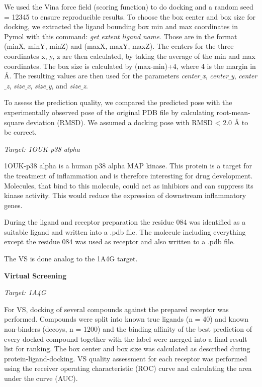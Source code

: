 \documentclass[a4paper,10pt]{article}
\begin{document}
We used the Vina force field (scoring function) to do docking and a random seed = 12345 to ensure reproducible results. To choose the box center and box size for docking, we extracted the ligand bounding box min and max coordinates in Pymol with this command: \textit{get$\_$extent ligand$\_$name}. Those are in the format (minX, minY, minZ) and (maxX, maxY, maxZ). The centers for the three coordinates x, y, z are then calculated, by taking the average of the min and max coordinates. The box size is calculated by (max-min)+4, where 4 is the margin in Å. The resulting values are then used for the parameters \textit{center$\_$x}, \textit{center$\_$y}, \textit{center$\_$z}, \textit{size$\_$x}, \textit{size$\_$y}, and \textit{size$\_$z}.

To assess the prediction quality, we compared the predicted pose with the experimentally observed pose of the original PDB file by calculating root-mean-square deviation (RMSD). We assumed a docking pose with RMSD < 2.0 Å to be correct.

\textit{Target: 1OUK-p38 alpha}

1OUK-p38 alpha is  a human p38 alpha MAP kinase. This protein is a target for the treatment of inflammation and is therefore interesting for drug development. Molecules, that bind to this molecule, could act as inhibiors and can suppress its kinase activity. This would reduce the expression of downstream inflammatory genes. \cite{1OUK}

During the ligand and receptor preparation the residue 084 was identified as a suitable ligand and written into a .pdb file. The molecule including everything except the residue 084 was used as receptor and also written to a .pdb file. 

The VS is done analog to the 1A4G target.

\textbf{Virtual Screening}

\textit{Target: 1A4G}

For VS, docking of several compounds against the prepared receptor was performed. Compounds were split into known true ligands (n = 40) and known non-binders (decoys, n = 1200) and the binding affinity of the best prediction of every docked compound together with the label were merged into a final result list for ranking. The box center and box size was calculated as described during protein-ligand-docking.
VS quality assessment for each receptor was performed using the receiver operating characteristic (ROC) curve and calculating the area under the curve (AUC).
\end{document}

